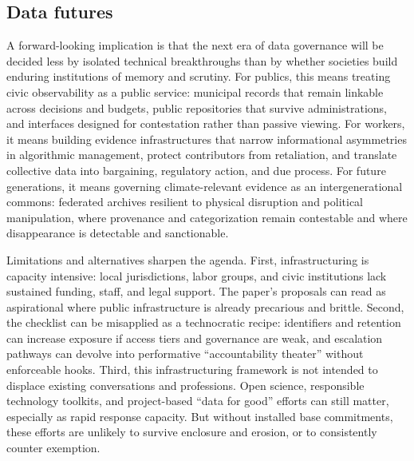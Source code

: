 \documentclass[acmsmall,screen]{acmart}
\begin{document}
\subsection*{Data futures}
A forward-looking implication is that the next era of data governance will be decided less by isolated technical breakthroughs than by whether societies build enduring institutions of memory and scrutiny. For publics, this means treating civic observability as a public service: municipal records that remain linkable across decisions and budgets, public repositories that survive administrations, and interfaces designed for contestation rather than passive viewing. For workers, it means building evidence infrastructures that narrow informational asymmetries in algorithmic management, protect contributors from retaliation, and translate collective data into bargaining, regulatory action, and due process. For future generations, it means governing climate-relevant evidence as an intergenerational commons: federated archives resilient to physical disruption and political manipulation, where provenance and categorization remain contestable and where disappearance is detectable and sanctionable.

Limitations and alternatives sharpen the agenda. First, infrastructuring is capacity intensive: local jurisdictions, labor groups, and civic institutions lack sustained funding, staff, and legal support. The paper's proposals can read as aspirational where public infrastructure is already precarious and brittle. Second, the checklist can be misapplied as a technocratic recipe: identifiers and retention can increase exposure if access tiers and governance are weak, and escalation pathways can devolve into performative ``accountability theater'' without enforceable hooks. Third, this infrastructuring framework is not intended to displace existing conversations and professions. Open science, responsible technology toolkits, and project-based ``data for good'' efforts can still matter, especially as rapid response capacity. But without installed base commitments, these efforts are unlikely to survive enclosure and erosion, or to consistently counter exemption.
\end{document}
